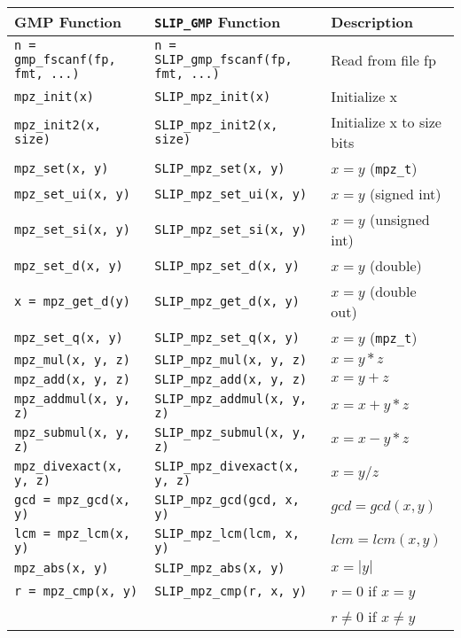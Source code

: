 \documentclass[12pt]{article}
\theoremstyle{definition}
\begin{document}
{\begin{center}
\begin{tabular}{|l|l|l|}
{\bf GMP Function} & \verb|SLIP_GMP| {\bf Function} & {\bf Description} \\
\hline\hline
\verb|n = gmp_fscanf(fp, fmt, ...)|
    & \verb|n = SLIP_gmp_fscanf(fp, fmt, ...)|
    & Read from file fp \\ \hline
\verb|mpz_init(x)|
    & \verb|SLIP_mpz_init(x)|
    & Initialize x \\ \hline
\verb|mpz_init2(x, size)|
    & \verb|SLIP_mpz_init2(x, size)|
    & Initialize x to size bits \\ \hline
\verb|mpz_set(x, y)|
    & \verb|SLIP_mpz_set(x, y)| 
    & $x = y$ (\verb|mpz_t|) \\ \hline
\verb|mpz_set_ui(x, y)|
    & \verb|SLIP_mpz_set_ui(x, y)|
    & $x = y$ (signed int) \\ \hline
\verb|mpz_set_si(x, y)|
    & \verb|SLIP_mpz_set_si(x, y)|
    & $x = y$ (unsigned int) \\ \hline
\verb|mpz_set_d(x, y)|
    & \verb|SLIP_mpz_set_d(x, y)|
    & $x = y$ (double)\\ \hline
\verb|x = mpz_get_d(y)|
    & \verb|SLIP_mpz_get_d(x, y)|
    & $x = y$ (double out) \\ \hline
\verb|mpz_set_q(x, y)|
    & \verb|SLIP_mpz_set_q(x, y)|
    & $x = y$ (\verb|mpz_t|) \\ \hline
\verb|mpz_mul(x, y, z)|
    & \verb|SLIP_mpz_mul(x, y, z)|
    & $x = y*z$ \\ \hline
\verb|mpz_add(x, y, z)|
    & \verb|SLIP_mpz_add(x, y, z)|
    & $x = y+z$ \\ \hline
\verb|mpz_addmul(x, y, z)|
    & \verb|SLIP_mpz_addmul(x, y, z)|
    & $x = x+y*z$ \\ \hline
\verb|mpz_submul(x, y, z)|
    & \verb|SLIP_mpz_submul(x, y, z)|
    & $x = x-y*z$ \\ \hline
\verb|mpz_divexact(x, y, z)|
    & \verb|SLIP_mpz_divexact(x, y, z)|
    & $x = y/z$ \\ \hline
\verb|gcd = mpz_gcd(x, y)|
    & \verb|SLIP_mpz_gcd(gcd, x, y)|
    & $gcd = gcd(x,y)$\\ \hline
\verb|lcm = mpz_lcm(x, y)|
    & \verb|SLIP_mpz_lcm(lcm, x, y)|
    & $lcm = lcm(x,y)$ \\ \hline
\verb|mpz_abs(x, y)|
    & \verb|SLIP_mpz_abs(x, y)|
    & $x = |y|$ \\ \hline
\verb|r = mpz_cmp(x, y)|
    & \verb|SLIP_mpz_cmp(r, x, y)|
    & $r = 0$ if $x=y$\\&& $r\neq 0$  if $x\neq y$ \\ \hline

\end{tabular}
\end{center}}
\end{document}
